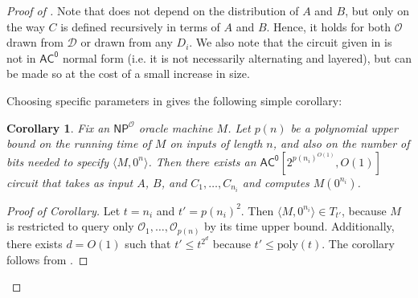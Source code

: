\documentclass[10pt,a4paper]{article}
\newtheorem{corollary}[theorem]{Corollary}
\newcommand{\poly}{\mathrm{poly}}
\begin{document}
\begin{proof}[Proof of ]
Note that  does not depend on the distribution of $A$ and $B$, but only on the way $C$ is defined recursively in terms of $A$ and $B$. Hence, it holds for both $\mathcal{O}$ drawn from $\mathcal{D}$ or drawn from any $D_i$. We also note that the circuit given in  is not in $\mathsf{AC^0}$ normal form (i.e. it is not necessarily alternating and layered), but can be made so at the cost of a small increase in size.

Choosing specific parameters in  gives the following simple corollary:
\begin{corollary}
\label{cor:recursive_np_ac0_M}
Fix an $\mathsf{NP}^\mathcal{O}$ oracle machine $M$. Let $p(n)$ be a polynomial upper bound on the running time of $M$ on inputs of length $n$, and also on the number of bits needed to specify $\langle M, 0^n \rangle$. Then there exists an $\mathsf{AC^0}\left[2^{p(n_i)^{O(1)}}, O(1) \right]$ circuit that takes as input $A$, $B$, and $C_1,\ldots,C_{n_i}$ and computes $M\left(0^{n_i}\right)$.
\end{corollary}

\begin{proof}[Proof of Corollary]
Let $t = n_i$ and $t' = p(n_i)^2$. Then $\langle M, 0^{n_i} \rangle \in T_{t'}$, because $M$ is restricted to query only $\mathcal{O}_1,\ldots,\mathcal{O}_{p(n)}$ by its time upper bound. Additionally, there exists $d = O(1)$ such that $t' \le t^{2^d}$ because $t' \le \poly(t)$. The corollary follows from .
\end{proof}



\end{proof}
\end{document}
